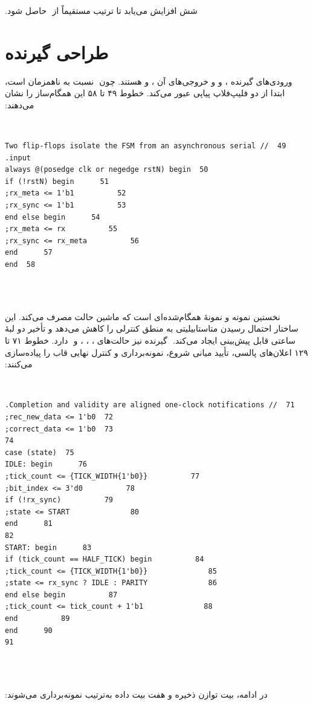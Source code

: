 ‫شش افزایش می‌یابد تا ترتیب  مستقیماً از
‫ حاصل شود.
‫
‫
‫\section{طراحی گیرنده}
‫
‫ورودی‌های گیرنده ،  و  و خروجی‌های آن
‫،  و  هستند. چون
‫ نسبت به  ناهمزمان است، ابتدا از دو
‫فلیپ‌فلاپ پیاپی عبور می‌کند. خطوط ۴۹ تا ۵۸ این
‫همگام‌ساز را نشان می‌دهند:
‫
‫\begin{dsdlcodeblock}
‫\begin{verbatim}
‫49  // Two flip-flops isolate the FSM from an asynchronous serial input.
‫50  always @(posedge clk or negedge rstN) begin
‫51      if (!rstN) begin
‫52          rx_meta <= 1'b1;
‫53          rx_sync <= 1'b1;
‫54      end else begin
‫55          rx_meta <= rx;
‫56          rx_sync <= rx_meta;
‫57      end
‫58  end
‫\end{verbatim}
‫\end{dsdlcodeblock}
‫
‫ نخستین نمونه و  نمونهٔ همگام‌شده‌ای است که ماشین حالت
‫مصرف می‌کند. این ساختار احتمال رسیدن متاستابیلیتی به منطق
‫کنترلی را کاهش می‌دهد و تأخیر
‫دو لبهٔ ساعتی قابل پیش‌بینی ایجاد می‌کند.
‫
‫گیرنده نیز حالت‌های ، ، ،  و
‫ دارد. خطوط ۷۱ تا ۱۲۹ اعلان‌های پالسی، تأیید میانی شروع، نمونه‌برداری و کنترل
‫نهایی قاب را پیاده‌سازی می‌کنند:
‫
‫\begin{dsdlcodeblock}
‫\begin{verbatim}
‫71  // Completion and validity are aligned one-clock notifications.
‫72  rec_new_data <= 1'b0;
‫73  correct_data <= 1'b0;
‫74
‫75  case (state)
‫76      IDLE: begin
‫77          tick_count <= {TICK_WIDTH{1'b0}};
‫78          bit_index <= 3'd0;
‫79          if (!rx_sync)
‫80              state <= START;
‫81      end
‫82
‫83      START: begin
‫84          if (tick_count == HALF_TICK) begin
‫85              tick_count <= {TICK_WIDTH{1'b0}};
‫86              state <= rx_sync ? IDLE : PARITY;
‫87          end else begin
‫88              tick_count <= tick_count + 1'b1;
‫89          end
‫90      end
‫91
‫\end{verbatim}
‫\end{dsdlcodeblock}
‫
‫در ادامه، بیت توازن ذخیره و هفت بیت داده به‌ترتیب نمونه‌برداری می‌شوند:
‫
